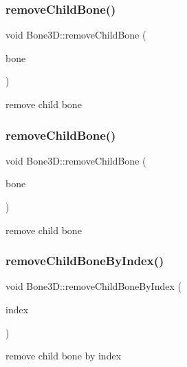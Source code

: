\subsubsection{\texorpdfstring{remove\+Child\+Bone()}{removeChildBone()}\hspace{0.1cm}{\footnotesize\ttfamily [1/2]}}
{\footnotesize\ttfamily void Bone3\+D\+::remove\+Child\+Bone (\begin{DoxyParamCaption}\item[{\hyperlink{classBone3D}{Bone3D} $\ast$}]{bone }\end{DoxyParamCaption})}

remove child bone \mbox{\label{classBone3D_a384bcaace89faea2a5e61d7c172476f6}} 
\subsubsection{\texorpdfstring{remove\+Child\+Bone()}{removeChildBone()}\hspace{0.1cm}{\footnotesize\ttfamily [2/2]}}
{\footnotesize\ttfamily void Bone3\+D\+::remove\+Child\+Bone (\begin{DoxyParamCaption}\item[{\hyperlink{classBone3D}{Bone3D} $\ast$}]{bone }\end{DoxyParamCaption})}

remove child bone \mbox{\label{classBone3D_a8ab61153ed7c8c90954346b6241e4e5c}} 
\subsubsection{\texorpdfstring{remove\+Child\+Bone\+By\+Index()}{removeChildBoneByIndex()}\hspace{0.1cm}{\footnotesize\ttfamily [1/2]}}
{\footnotesize\ttfamily void Bone3\+D\+::remove\+Child\+Bone\+By\+Index (\begin{DoxyParamCaption}\item[{int}]{index }\end{DoxyParamCaption})}

remove child bone by index \mbox{\label{classBone3D_a8ab61153ed7c8c90954346b6241e4e5c}} 

